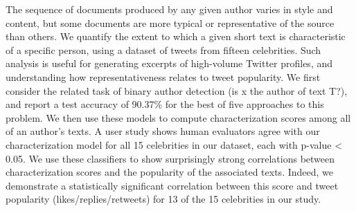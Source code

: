 The sequence of documents produced by any given author varies in style and content, but some documents are more typical or representative of the source than others.  We quantify the extent to which a given short text is characteristic of a specific person, using a dataset of tweets from fifteen celebrities.  Such analysis is useful for generating excerpts of high-volume Twitter profiles, and understanding how representativeness relates to tweet popularity. We first consider the related task of binary author detection (is x the author of text T?), and report a test accuracy of 90.37\% for the best of five approaches to this problem. We then use these models to compute characterization scores among all of an author's texts. A user study shows human evaluators agree with our characterization model for all 15 celebrities in our dataset, each with p-value < 0.05. We use these classifiers to show surprisingly strong correlations between characterization scores and the popularity of the associated texts. Indeed, we demonstrate a statistically significant correlation between this score and tweet popularity (likes/replies/retweets) for 13 of the 15 celebrities in our study.